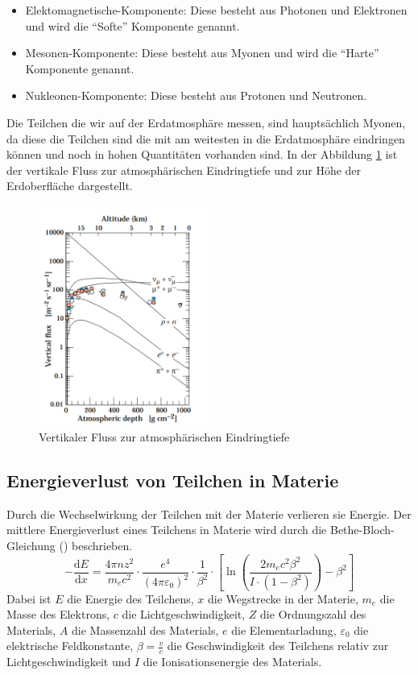 \documentclass{article}
\begin{document}
\begin{itemize}
    \item Elektomagnetische-Komponente: Diese besteht aus Photonen und Elektronen und wird die \enquote{Softe} Komponente genannt.
    \item Mesonen-Komponente: Diese besteht aus Myonen und wird die \enquote{Harte} Komponente genannt.
    \item Nukleonen-Komponente: Diese besteht aus Protonen und Neutronen.
\end{itemize}
Die Teilchen die wir auf der Erdatmosphäre messen, sind hauptsächlich Myonen, da diese die Teilchen sind die mit am weitesten
in die Erdatmosphäre eindringen können und noch in hohen Quantitäten vorhanden sind.
In der Abbildung \ref{fig:Fluss} ist der vertikale Fluss zur atmosphärischen Eindringtiefe und zur Höhe der Erdoberfläche dargestellt.
\begin{figure}[H]
    \centering
    \includegraphics[width=0.5\textwidth]{figures/Fluss.png}
    \caption{Vertikaler Fluss zur atmosphärischen Eindringtiefe \cite{Naka}}
    \label{fig:Fluss}
\end{figure} 

\subsection{Energieverlust von Teilchen in Materie}
Durch die Wechselwirkung der Teilchen mit der Materie verlieren sie Energie. Der mittlere Energieverlust eines Teilchens in Materie wird durch die Bethe-Bloch-Gleichung (\cite{Bethe}) beschrieben.
\begin{equation*}
    -\frac{\mathrm{d}E}{\mathrm{d}x} = \frac{4\pi n z^2}{m_e c^2} \cdot \frac{e^4}{(4\pi \varepsilon_0)^2} \cdot \frac{1}{\beta^2} \cdot \left[ \ln\left(\frac{2 m_e c^2 \beta^2 }{I\cdot (1-\beta^2)}\right) - \beta^2 \right]    
\end{equation*}
Dabei ist $E$ die Energie des Teilchens, $x$ die Wegstrecke in der Materie, $m_e$ die Masse des Elektrons, $c$ die Lichtgeschwindigkeit, $Z$ die Ordnungszahl des Materials, $A$ die Massenzahl des Materials, $e$ die Elementarladung, $\varepsilon_0$ die elektrische Feldkonstante, $\beta = \frac{v}{c}$ die Geschwindigkeit des Teilchens relativ zur Lichtgeschwindigkeit und $I$ die Ionisationsenergie des Materials. 
\end{document}
